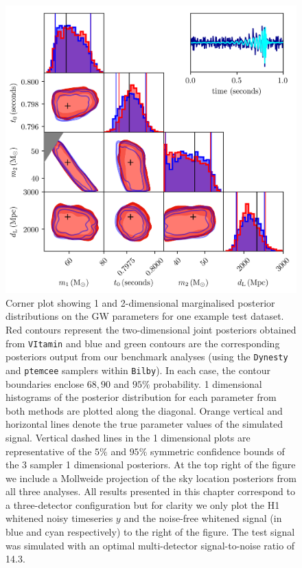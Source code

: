 %
%
\begin{figure}
    \includegraphics[width=\textwidth]{corner_testcase0.png}
    \caption[Corner plot showing 1 and 2-dimensional
    marginalised posterior distributions on the \ac{GW} parameters for 
    one example test dataset.]{\label{fig:corner_plot} Corner plot showing 
    1 and 2-dimensional marginalised posterior distributions on the 
    \ac{GW} parameters for one example test dataset. Red contours 
    represent the two-dimensional joint posteriors obtained from 
    \texttt{VItamin} and blue and green contours are the corresponding 
    posteriors output from our benchmark analyses 
    (using the \texttt{Dynesty} and \texttt{ptemcee} samplers 
    within \texttt{Bilby}). In each case, the contour boundaries enclose 
    $68,90$ and $95\%$ probability. 1 dimensional histograms of the 
    posterior distribution for each parameter from both methods are 
    plotted along the diagonal. Orange vertical and horizontal lines 
    denote the true parameter values of the simulated 
    signal. Vertical 
    dashed lines in the 1 dimensional plots are representative of the $5\%$ and 
    $95\%$ symmetric confidence bounds of the 3 sampler 1 dimensional posteriors.
    At the top right of the figure we include a Mollweide projection of 
    the sky location posteriors from all three analyses. All results 
    presented in this chapter correspond to a three-detector configuration 
    but for clarity we only plot the H1 whitened noisy timeseries $y$ and 
    the noise-free whitened signal (in blue and cyan respectively) to the 
    right of the figure. The test signal was simulated with an 
    optimal multi-detector signal-to-noise ratio of 14.3.~} 
\end{figure}


